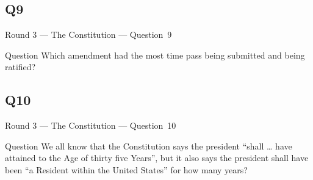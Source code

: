 \documentclass[11pt,draft]{beamer}
\begin{document}
\subsection*{Q9}
\begin{frame}[t]{Round 3 --- The Constitution --- \mbox{Question 9}}
    \begin{block}{Question}
        Which amendment had the most time pass being submitted and being ratified?
    \end{block}
\end{frame}
\subsection*{Q10}
\begin{frame}[t]{Round 3 --- The Constitution --- \mbox{Question 10}}
    \begin{block}{Question}
        We all know that the Constitution says the president ``shall \ldots{} have attained to the Age of thirty five Years'', but it also says the president shall have been ``a Resident within the United States'' for how many years?
    \end{block}
\end{frame}
\end{document}
